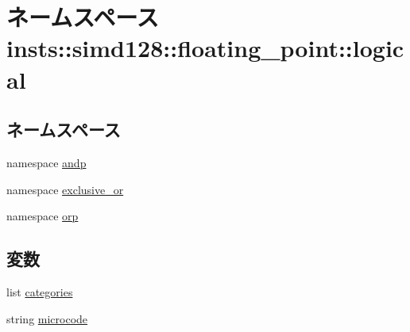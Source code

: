 \hypertarget{namespaceinsts_1_1simd128_1_1floating__point_1_1logical}{
\section{ネームスペース insts::simd128::floating\_\-point::logical}
\label{namespaceinsts_1_1simd128_1_1floating__point_1_1logical}
}
\subsection*{ネームスペース}
\begin{DoxyCompactItemize}
\item 
namespace \hyperlink{namespaceinsts_1_1simd128_1_1floating__point_1_1logical_1_1andp}{andp}
\item 
namespace \hyperlink{namespaceinsts_1_1simd128_1_1floating__point_1_1logical_1_1exclusive__or}{exclusive\_\-or}
\item 
namespace \hyperlink{namespaceinsts_1_1simd128_1_1floating__point_1_1logical_1_1orp}{orp}
\end{DoxyCompactItemize}
\subsection*{変数}
\begin{DoxyCompactItemize}
\item 
list \hyperlink{namespaceinsts_1_1simd128_1_1floating__point_1_1logical_a273cf0f1630af14c1582f05e53354a55}{categories}
\item 
string \hyperlink{namespaceinsts_1_1simd128_1_1floating__point_1_1logical_a770f11a173e99389a8802f0107ed8f52}{microcode}
\end{DoxyCompactItemize}



